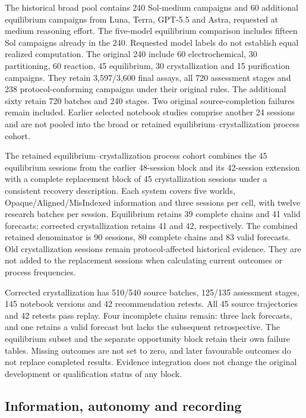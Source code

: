 \documentclass[10pt,a4paper]{article}
\begin{document}
The historical broad pool contains 240 Sol-medium campaigns and 60 additional equilibrium campaigns from Luna, Terra, GPT-5.5 and Astra, requested at medium reasoning effort. The five-model equilibrium comparison includes fifteen Sol campaigns already in the 240. Requested model labels do not establish equal realized computation. The original 240 include 60 electrochemical, 30 partitioning, 60 reaction, 45 equilibrium, 30 crystallization and 15 purification campaigns. They retain 3,597/3,600 final assays, all 720 assessment stages and 238 protocol-conforming campaigns under their original rules. The additional sixty retain 720 batches and 240 stages. Two original source-completion failures remain included. Earlier selected notebook studies comprise another 24 sessions and are not pooled into the broad or retained equilibrium--crystallization process cohort.

The retained equilibrium--crystallization process cohort combines the 45 equilibrium sessions from the earlier 48-session block and its 42-session extension with a complete replacement block of 45 crystallization sessions under a consistent recovery description. Each system covers five worlds, Opaque/Aligned/MisIndexed information and three sessions per cell, with twelve research batches per session. Equilibrium retains 39 complete chains and 41 valid forecasts; corrected crystallization retains 41 and 42, respectively. The combined retained denominator is 90 sessions, 80 complete chains and 83 valid forecasts. Old crystallization sessions remain protocol-affected historical evidence. They are not added to the replacement sessions when calculating current outcomes or process frequencies.

Corrected crystallization has 510/540 source batches, 125/135 assessment stages, 145 notebook versions and 42 recommendation retests. All 45 source trajectories and 42 retests pass replay. Four incomplete chains remain: three lack forecasts, and one retains a valid forecast but lacks the subsequent retrospective. The equilibrium subset and the separate opportunity block retain their own failure tables. Missing outcomes are not set to zero, and later favourable outcomes do not replace completed results. Evidence integration does not change the original development or qualification status of any block.

\subsection{Information, autonomy and recording}\label{information-autonomy-and-recording}
\end{document}
